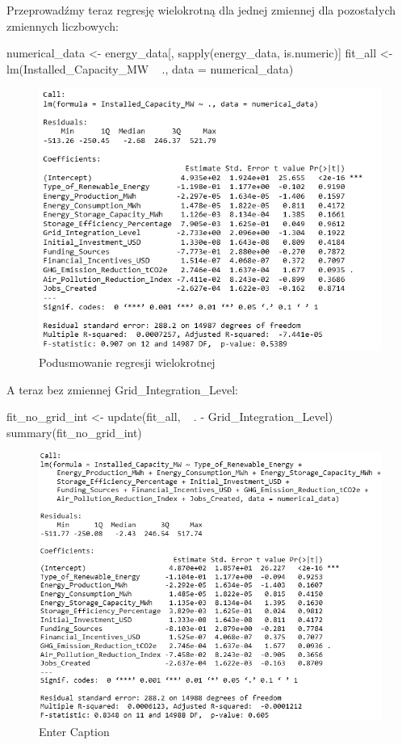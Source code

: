 Przeprowadźmy teraz regresję wielokrotną dla jednej zmiennej dla pozostałych zmiennych liczbowych:

\begin{Rcode}
numerical_data <- energy_data[, sapply(energy_data, is.numeric)]
fit_all <- lm(Installed_Capacity_MW ~ ., data = numerical_data)
\end{Rcode}

\begin{figure}[H]
    \centering
    \includegraphics[width=1\linewidth]{lab1/obraz10.png}
    \caption{Podusmowanie regresji wielokrotnej}
    \label{fig:enter-label}
\end{figure}

A teraz bez zmiennej Grid\_Integration\_Level:

\begin{Rcode}
fit_no_grid_int <- update(fit_all, ~ . - Grid_Integration_Level)
summary(fit_no_grid_int)
\end{Rcode}

\begin{figure}[H]
    \centering
    \includegraphics[width=1\linewidth]{lab1/obraz12.png}
    \caption{Enter Caption}
    \label{fig:enter-label}
\end{figure}

